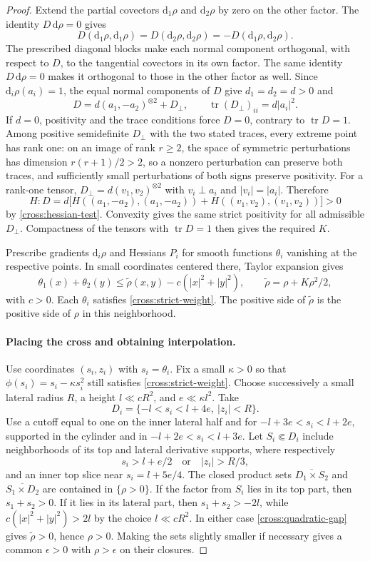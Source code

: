 \documentclass[11pt,a4paper]{article}
\theoremstyle{definition}
\theoremstyle{remark}
\newcommand{\dd}{\mathrm d}
\DeclareMathOperator{\tr}{tr}
\numberwithin{equation}{section}
\begin{document}
\begin{proof}
Extend the partial covectors $\dd_1\rho$ and $\dd_2\rho$ by
zero on the other factor. The identity $D\,\dd\rho=0$ gives
\[
 D(\dd_1\rho,\dd_1\rho)
 =D(\dd_2\rho,\dd_2\rho)
 =-D(\dd_1\rho,\dd_2\rho).
\]
The prescribed diagonal blocks make each normal component orthogonal,
with respect to $D$, to the tangential covectors in its own factor.
The same identity $D\,\dd\rho=0$ makes it orthogonal to those in
the other factor as well. Since $\dd_i\rho(a_i)=1$, the equal
normal components of $D$ give $d_1=d_2=d>0$ and
\[
 D=d(a_1,-a_2)^{\otimes2}+D_\perp,
 \qquad \tr(D_\perp)_{ii}=d|a_i|^2.
\]
If $d=0$, positivity and the trace conditions force $D=0$,
contrary to $\tr D=1$. Among positive semidefinite $D_\perp$ with
the two stated traces, every extreme point has rank one: on an image
of rank $r\ge2$, the space of symmetric perturbations has dimension
$r(r+1)/2>2$, so a nonzero perturbation can preserve both traces,
and sufficiently small perturbations of both signs preserve positivity.
For a rank-one tensor,
$D_\perp=d(v_1,v_2)^{\otimes2}$ with
$v_i\perp a_i$ and $|v_i|=|a_i|$. Therefore
\[
 H:D=d\bigl[
 H((a_1,-a_2),(a_1,-a_2))
 +H((v_1,v_2),(v_1,v_2))\bigr]>0
\]
by \eqref{cross:hessian-test}. Convexity gives the same strict
positivity for all admissible $D_\perp$. Compactness of the tensors
with $\tr D=1$ then gives the required $K$.

Prescribe gradients $\dd_i\rho$ and Hessians $P_i$ for smooth functions
$\theta_i$ vanishing at the respective points.  In small coordinates
centered there, Taylor expansion gives
\begin{equation}\label{cross:quadratic-gap}
 \theta_1(x)+\theta_2(y)
 \le \widetilde\rho(x,y)-c(|x|^2+|y|^2),
 \qquad \widetilde\rho=\rho+K\rho^2/2,
\end{equation}
with $c>0$.  Each $\theta_i$ satisfies
\eqref{cross:strict-weight}.  The positive side of $\widetilde\rho$
is the positive side of $\rho$ in this neighborhood.

\paragraph{Placing the cross and obtaining interpolation.}
Use coordinates $(s_i,z_i)$ with $s_i=\theta_i$. Fix a small
$\kappa>0$ so that $\phi(s_i)=s_i-\kappa s_i^2$ still satisfies
\eqref{cross:strict-weight}. Choose successively a small lateral
radius $R$, a height $l\ll cR^2$, and $e\ll\kappa l^2$. Take
\[
 D_i=\{-l<s_i<l+4e,\ |z_i|<R\}.
\]
Use a cutoff equal to one on the inner lateral half and for
$-l+3e<s_i<l+2e$, supported in the cylinder and in
$-l+2e<s_i<l+3e$.
Let $S_i\Subset D_i$ include neighborhoods of its top and lateral
derivative supports, where respectively
\[
 s_i>l+e/2\quad\text{or}\quad |z_i|>R/3,
\]
and an inner top slice near $s_i=l+5e/4$.
The closed product sets $\overline{D_1\times S_2}$ and
$\overline{S_1\times D_2}$ are contained in $\{\rho>0\}$.
If the factor from $S_i$ lies in its top part, then $s_1+s_2>0$.
If it lies in its lateral part, then $s_1+s_2>-2l$, while
$c(|x|^2+|y|^2)>2l$ by the choice $l\ll cR^2$.
In either case \eqref{cross:quadratic-gap} gives
$\widetilde\rho>0$, hence $\rho>0$.
Making the sets slightly smaller if necessary gives a common
$\epsilon>0$ with $\rho>\epsilon$ on their closures.


\end{proof}
\end{document}
